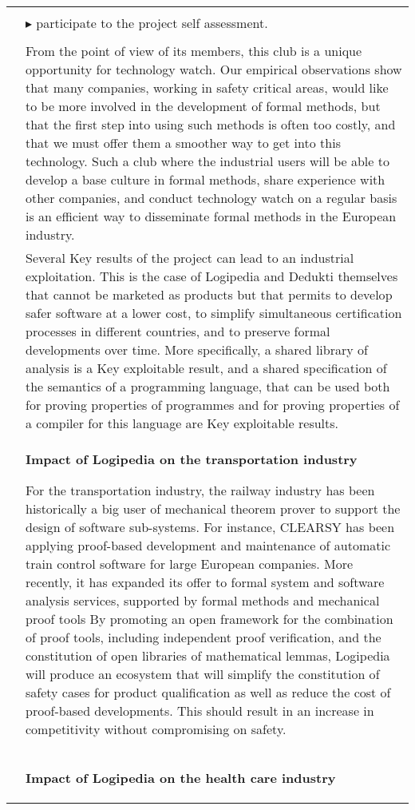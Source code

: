 \begin{longtable}{|p{}|p{}|}
&\\
&
$\blacktriangleright$ participate to the project self assessment.\\
&\\
&
\hspace{0.4cm}
From the point of view of its members, this club is a unique
opportunity for technology watch. Our empirical observations show that
many companies, working in safety critical areas, would like to be
more involved in the development of formal methods, but that the first
step into using such methods is often too costly, and that we must
offer them a smoother way to get into this technology. Such a club
where the industrial users will be able to develop a base culture in
formal methods, share experience with other companies, and conduct
technology watch on a regular basis is an efficient way to disseminate
formal methods in the European industry.\\
&
\hspace{0.4cm}
Several Key results of the project can lead to an industrial
exploitation. This is the case of Logipedia and Dedukti themselves
that cannot be marketed as products but that permits to develop safer
software at a lower cost, to simplify simultaneous certification
processes in different countries, and to preserve formal developments
over time. More specifically, a shared library of analysis is a Key
exploitable result, and a shared specification of the semantics of a
programming language, that can be used both for proving properties of
programmes and for proving properties of a compiler for this language
are Key exploitable results.\\
&
\begin{framed}
{\bf \Large Impact of Logipedia on the transportation industry}

For the transportation industry, the railway industry has been
historically a big user of mechanical theorem prover to support the
design of software sub-systems. For instance, CLEARSY has been
applying proof-based development and maintenance of automatic train
control software for large European companies. More recently, it has
expanded its offer to formal system and software analysis services,
supported by formal methods and mechanical proof tools
By promoting an open framework for the combination of proof tools,
including independent proof verification, and the constitution of open
libraries of mathematical lemmas, Logipedia will produce an ecosystem
that will simplify the constitution of safety cases for product
qualification as well as reduce the cost of proof-based developments.
This should result in an increase in competitivity without compromising
on safety.
\end{framed}\\
&
\begin{framed}
{\bf \Large Impact of Logipedia on the health care industry}


\end{framed}
\end{longtable}
